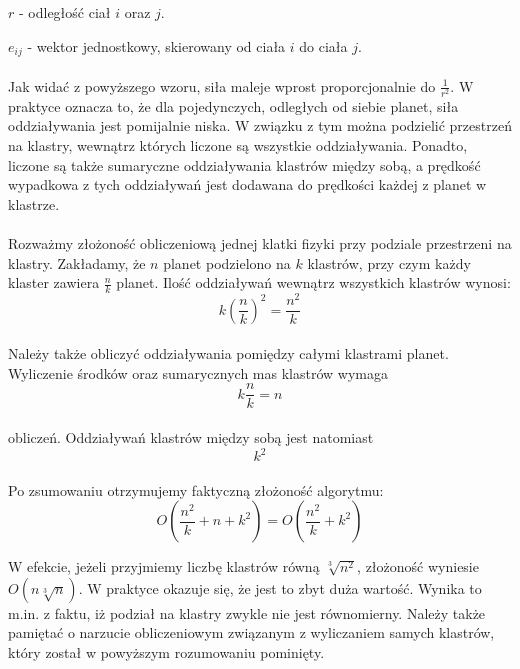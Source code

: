 $ r $ - odległość ciał $i$ oraz $j$. 

$ e_{ij} $ - wektor jednostkowy, skierowany od ciała $i$ do ciała $j$. 

\paragraph{}

Jak widać z powyższego wzoru, siła maleje wprost proporcjonalnie do $ \frac {1}{r^2} $. W praktyce oznacza to, że dla pojedynczych, odległych od siebie planet, siła oddziaływania jest pomijalnie niska. W związku z tym można podzielić przestrzeń na klastry, wewnątrz których liczone są wszystkie oddziaływania. Ponadto, liczone są także sumaryczne oddziaływania klastrów między sobą, a prędkość wypadkowa z tych oddziaływań jest dodawana do prędkości każdej z planet w klastrze.

\paragraph{}
Rozważmy złożoność obliczeniową jednej klatki fizyki przy podziale przestrzeni na klastry. Zakładamy, że $n$ planet podzielono na $k$ klastrów, przy czym każdy klaster zawiera $\frac{n}{k}$ planet. Ilość oddziaływań wewnątrz wszystkich klastrów wynosi:
$$ k\left(\frac{n}{k}\right)^2 = \frac{n^2}{k}$$

\paragraph{}
Należy także obliczyć oddziaływania pomiędzy całymi klastrami planet. Wyliczenie środków oraz sumarycznych mas klastrów wymaga
$$ k\frac{n}{k} = n $$

\paragraph{}
obliczeń. Oddziaływań klastrów między sobą jest natomiast
$$ k^2 $$

\paragraph{}
Po zsumowaniu otrzymujemy faktyczną złożoność algorytmu:
$$ O( \frac{n^2}{k} + n + k^2 ) = O( \frac{n^2}{k} + k^2 ) $$

W efekcie, jeżeli przyjmiemy liczbę klastrów równą $\sqrt[3]{n^2}$, złożoność wyniesie $O(n\sqrt[3]{n})$. W praktyce okazuje się, że jest to zbyt duża wartość. Wynika to m.in. z faktu, iż podział na klastry zwykle nie jest równomierny. Należy także pamiętać o narzucie obliczeniowym związanym z wyliczaniem samych klastrów, który został w powyższym rozumowaniu pominięty.

